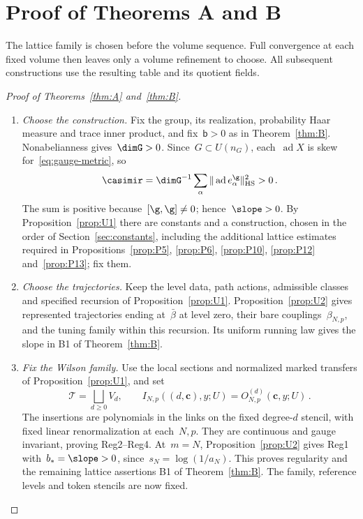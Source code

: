 \section{Proof of Theorems A and B}\label{sec:deduction}

The lattice family is chosen before the volume sequence. Full convergence at each fixed volume then leaves only a volume refinement to choose. All subsequent constructions use the resulting table and its quotient fields.

\begin{proof}[Proof of Theorems~\ref{thm:A} and~\ref{thm:B}]\leavevmode
\begin{enumerate}[label=\emph{Step \arabic*:},ref=\arabic*,leftmargin=4.5em,itemsep=0.4em,beginpenalty=10000]
\item\label{step:deduction-choice} \emph{Choose the construction.} Fix the group, its realization, probability Haar measure and trace inner product, and fix~$\mathsf b>0$ as in Theorem~\ref{thm:B}. Nonabelianness gives~$\dimG>0$. Since~$G\subset U(n_G)$, each~$\operatorname{ad}X$ is skew for~\eqref{eq:gauge-metric}, so
\begin{equation}\label{eq:deduction-casimir}
\casimir=\dimG^{-1}\sum_\alpha\|\operatorname{ad}e_\alpha^{\g}\|_{\rm HS}^2>0\,.
\end{equation}
The sum is positive because~$[\g,\g]\ne0$; hence~$\slope>0$. By Proposition~\ref{prop:U1} there are constants and a construction, chosen in the order of Section~\ref{sec:constants}, including the additional lattice estimates required in Propositions~\ref{prop:P5}, \ref{prop:P6}, \ref{prop:P10}, \ref{prop:P12} and~\ref{prop:P13}; fix them.

\item\label{step:deduction-trajectories} \emph{Choose the trajectories.} Keep the level data, path actions, admissible classes and specified recursion of Proposition~\ref{prop:U1}. Proposition~\ref{prop:U2} gives represented trajectories ending at~$\bar\beta$ at level zero, their bare couplings~$\beta_{N,p}$, and the tuning family within this recursion. Its uniform running law gives the slope in B1 of Theorem~\ref{thm:B}.

\item\label{step:deduction-family} \emph{Fix the Wilson family.} Use the local sections and normalized marked transfers of Proposition~\ref{prop:U1}, and set
\begin{equation}\label{eq:deduction-family}
\mathcal T=\bigsqcup_{d\ge0}V_d,\qquad I_{N,p}((d,\mathbf c),y;U)=O^{(d)}_{N,p}(\mathbf c,y;U)\,.
\end{equation}
The insertions are polynomials in the links on the fixed degree-$d$ stencil, with fixed linear renormalization at each~$N,p$. They are continuous and gauge invariant, proving Reg2--Reg4. At~$m=N$, Proposition~\ref{prop:U2} gives Reg1 with~$b_*=\slope>0$, since~$s_N=\log(1/a_N)$. This proves regularity and the remaining lattice assertions B1 of Theorem~\ref{thm:B}. The family, reference levels and token stencils are now fixed.


\end{enumerate}
\end{proof}
